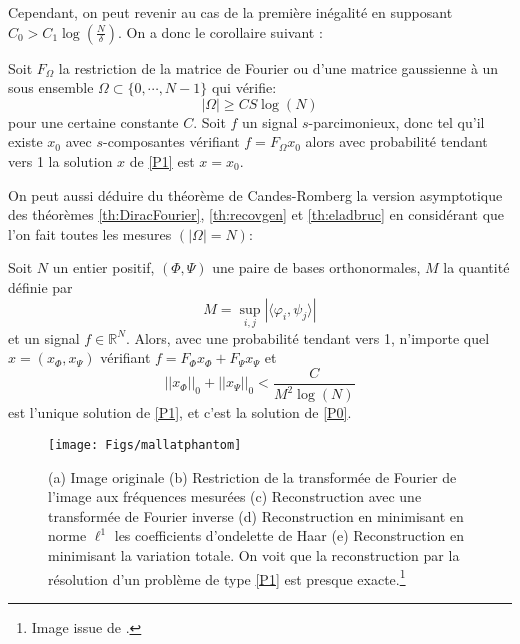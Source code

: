 Cependant, on peut revenir au cas de la première inégalité en supposant $C_0> C_1\log(\frac{N}{\delta})$. 
\newline
On a donc le corollaire suivant :
\begin{theoreme}
	Soit $F_{\Omega}$ la restriction de la matrice de Fourier ou d'une matrice gaussienne à un sous ensemble $\Omega \subset \{0, \cdots, N-1\}$ qui vérifie:
	\begin{equation}
		|\Omega| \geq C S \log(N)
	\end{equation}
	pour une certaine constante $C$.
	Soit $f$ un signal $s$-parcimonieux, donc tel qu'il existe $x_0$ avec $s$-composantes vérifiant $f=F_{\Omega}x_0$ alors avec probabilité tendant vers 1 la solution $x$ de \ref{P1} est $x=x_0$.
\end{theoreme}
On peut aussi déduire du théorème de Candes-Romberg la version asymptotique des théorèmes \ref{th:DiracFourier}, \ref{th:recovgen} et \ref{th:eladbruc} en considérant que l'on fait toutes les mesures $(|\Omega| =N)$:
\begin{theoreme}\label{th:recovgen}
		Soit $N$ un entier positif, $(\Phi, \Psi)$ une paire de bases orthonormales, $M$ la quantité définie par 
		\begin{equation}
			M = \sup_{i,j} |\langle \varphi_i, \psi_j \rangle|
		\end{equation}
		et un signal $f\in \mathbb{R}^N$. Alors, avec une probabilité tendant vers 1, n'importe quel $x = (x_\Phi, x_\Psi)$ vérifiant $f = F_\Phi x_\Phi + F_\Psi x_\Psi$ et
	\begin{equation}\label{eq:cond1}
		||x_\Phi||_0 +  ||x_\Psi||_0 < \frac{C}{M^2\log(N)}
	\end{equation}
	est l'unique solution de \ref{P1}, et c'est la solution de \ref{P0}.
\end{theoreme}
\begin{figure}
	\texttt{[image: Figs/mallatphantom]}
	\caption{(a) Image originale (b) Restriction de la transformée de Fourier de l'image aux fréquences mesurées (c) Reconstruction avec une transformée de Fourier inverse (d) Reconstruction en minimisant en norme $\ell^1$ les coefficients d'ondelette de Haar (e) Reconstruction en minimisant la variation totale. On voit que la reconstruction par la résolution d'un problème de type \ref{P1} est presque exacte.\footnote{Image issue de \cite{mallatbook}.}} 
\end{figure}
	


